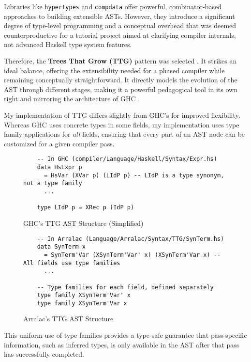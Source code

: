 Libraries like \texttt{hypertypes} \cite{hypertypes-hackage} and \texttt{compdata} \cite{compdata-hackage} offer powerful, combinator-based approaches to building extensible ASTs. However, they introduce a significant degree of type-level programming and a conceptual overhead that was deemed counterproductive for a tutorial project aimed at clarifying compiler internals, not advanced Haskell type system features.

Therefore, the \textbf{Trees That Grow (TTG)} pattern was selected \cite{trees-that-grow-2016}. It strikes an ideal balance, offering the extensibility needed for a phased compiler while remaining conceptually straightforward. It directly models the evolution of the AST through different stages, making it a powerful pedagogical tool in its own right and mirroring the architecture of GHC \cite{ghc-gitlab-2025}.


My implementation of TTG differs slightly from GHC's for improved flexibility. Whereas GHC uses concrete types in some fields, my implementation uses type family applications for \textit{all} fields, ensuring that every part of an AST node can be customized for a given compiler pass.

\begin{figure}
    \centering
    \begin{verbatim}
    -- In GHC (compiler/Language/Haskell/Syntax/Expr.hs)
    data HsExpr p
      = HsVar (XVar p) (LIdP p) -- LIdP is a type synonym, not a type family
      ...
    
    type LIdP p = XRec p (IdP p)
    \end{verbatim}
    \caption{GHC's TTG AST Structure (Simplified)}
\end{figure}

\begin{figure}
    \centering
    \begin{verbatim}
    -- In Arralac (Language/Arralac/Syntax/TTG/SynTerm.hs)
    data SynTerm x
      = SynTerm'Var (XSynTerm'Var' x) (XSynTerm'Var x) -- All fields use type families
      ...
    
    -- Type families for each field, defined separately
    type family XSynTerm'Var' x
    type family XSynTerm'Var x
    \end{verbatim}
    \caption{Arralac's TTG AST Structure}
\end{figure}

This uniform use of type families provides a type-safe guarantee that pass-specific information, such as inferred types, is only available in the AST after that pass has successfully completed.

